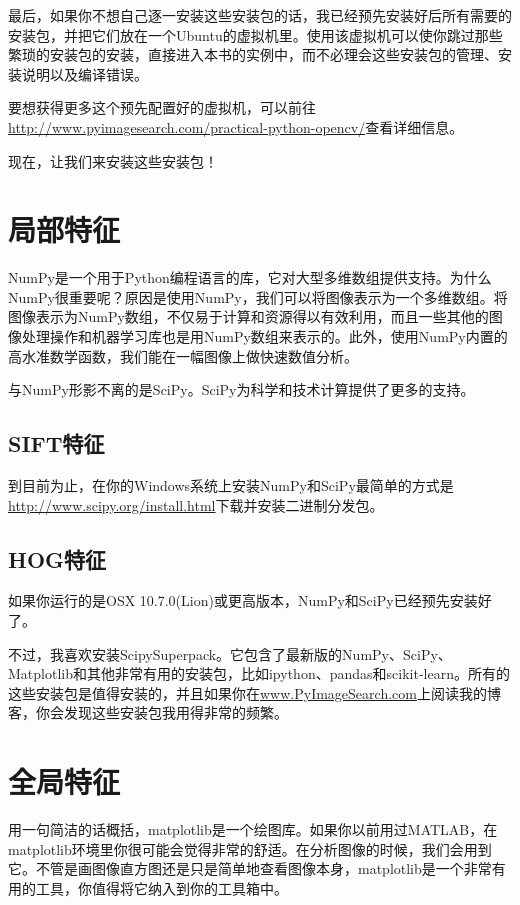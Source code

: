 \documentclass[color=cyan,mathpazo,titlestyle=hang]{elegantbook}
\begin{document}
最后，如果你不想自己逐一安装这些安装包的话，我已经预先安装好后所有需要的安装包，并把它们放在一个Ubuntu的虚拟机里。使用该虚拟机可以使你跳过那些繁琐的安装包的安装，直接进入本书的实例中，而不必理会这些安装包的管理、安装说明以及编译错误。

要想获得更多这个预先配置好的虚拟机，可以前往\url{http://www.pyimagesearch.com/practical-python-opencv/}查看详细信息。

现在，让我们来安装这些安装包！

\section{局部特征}

NumPy是一个用于Python编程语言的库，它对大型多维数组提供支持。为什么NumPy很重要呢？原因是使用NumPy，我们可以将图像表示为一个多维数组。将图像表示为NumPy数组，不仅易于计算和资源得以有效利用，而且一些其他的图像处理操作和机器学习库也是用NumPy数组来表示的。此外，使用NumPy内置的高水准数学函数，我们能在一幅图像上做快速数值分析。

与NumPy形影不离的是SciPy。SciPy为科学和技术计算提供了更多的支持。

\subsection{SIFT特征}

到目前为止，在你的Windows系统上安装NumPy和SciPy最简单的方式是\url{http://www.scipy.org/install.html}下载并安装二进制分发包。

\subsection{HOG特征}

如果你运行的是OSX 10.7.0(Lion)或更高版本，NumPy和SciPy已经预先安装好了。

不过，我喜欢安装ScipySuperpack。它包含了最新版的NumPy、SciPy、Matplotlib和其他非常有用的安装包，比如ipython、pandas和scikit-learn。所有的这些安装包是值得安装的，并且如果你在\url{www.PyImageSearch.com}上阅读我的博客，你会发现这些安装包我用得非常的频繁。

\section{全局特征}

用一句简洁的话概括，matplotlib是一个绘图库。如果你以前用过MATLAB，在matplotlib环境里你很可能会觉得非常的舒适。在分析图像的时候，我们会用到它。不管是画图像直方图还是只是简单地查看图像本身，matplotlib是一个非常有用的工具，你值得将它纳入到你的工具箱中。
\end{document}
